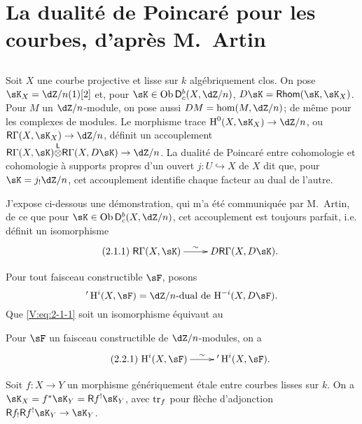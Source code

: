 \section{La dualité de Poincaré pour les courbes, d'apr\`es M.\ Artin}\label{V:2}





\subsection{}\label{V:2-1}

Soit $X$ une courbe projective et lisse sur $k$ alg\'ebriquement clos. On pose 
$\sK_X=\dZ/n(1)[2]$ et, pour $\sK\in\ob \D_c^b(X,\dZ/n)$, 
$D\sK=\rHom(\sK,\sK_X)$. Pour $M$ un $\dZ/n$-module, on pose aussi 
$D M = \hom(M,\dZ/n)$; de m\^eme pour les complexes de modules. Le morphisme 
trace $\h^0(X,\sK_X) \to \dZ/n$, ou $\R\Gamma(X,\sK_X)\to \dZ/n$, d\'efinit un 
accouplement $\R\Gamma(X,\sK)\lotimes\R\Gamma(X,D\sK) \to \dZ/n$. La dualit\'e 
de Poincar\'e entre cohomologie et cohomologie \`a supports propres d'un ouvert 
$j:U\hookrightarrow X$ de $X$ dit que, pour $\sK=j_!\dZ/n$, cet accouplement 
identifie chaque facteur au dual de l'autre. 

J'expose ci-dessous une d\'emonstration, qui m'a \'et\'e communiqu\'ee par 
M.\ Artin, de ce que pour $\sK\in\ob\D_c^b(X,\dZ/n)$, cet accouplement est 
toujours parfait, i.e. d\'efinit un isomorphisme
\begin{equation*}\tag{2.1.1}\label{V:eq:2-1-1}
\xymatrix{
  \R\Gamma(X,\sK) \ar[r]^-\sim 
    & D \R\Gamma(X,D\sK) \text{.}
}
\end{equation*}

Pour tout faisceau constructible $\sF$, posons 
\[
  '\h^i(X,\sF) = \text{$\dZ/n$-dual de $\h^{-i}(X,D\sF)$.}
\]
Que \eqref{V:eq:2-1-1} soit un isomorphisme \'equivaut au 





\begin{theorem_}\label{V:2-2}
Pour $\sF$ un faisceau constructible de $\dZ/n$-modules, on a 
\begin{equation*}\tag{2.2.1}\label{V:eq:2-2-1}
\xymatrix{
  \h^i(X,\sF) \ar[r]^-\sim 
    & '\h^i(X,\sF) \text{.}
}
\end{equation*}
\end{theorem_}





\begin{lemma_}\label{V:2-3}
Soit $f:X\to Y$ un morphisme g\'en\'eriquement \'etale entre courbes lisses sur 
$k$. On a $\sK_X=f^\ast\sK_Y=\R f^!\sK_Y$, avec $\operatorname{tr}_f$ pour fl\`eche 
d'adjonction $\R f_!\R f^!\sK_Y\to \sK_Y$.
\end{lemma_}


